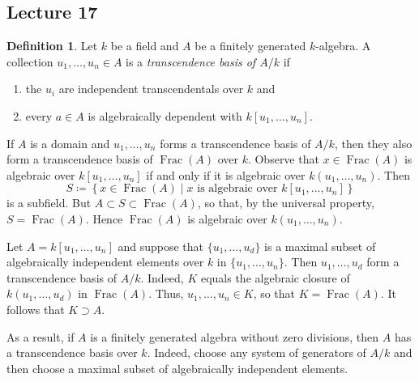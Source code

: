 \documentclass[10pt,letterpaper,cm]{nupset}
\theoremstyle{definition}
\newtheorem{definition}{Definition}[subsection]
\theoremstyle{theorem}
\theoremstyle{remark}
\newcommand{\1}{\mathbf{1}}
\newcommand{\0}{\vec 0}
\DeclareMathOperator{\Frac}{Frac}
\begin{document}
\subsection{Lecture 17}

\begin{definition}
Let $k$ be a field and $A$ be a finitely generated $k$-algebra. A collection $u_1, \ldots, u_n \in A$ is a \textit{transcendence basis of $A/k$} if 
\begin{enumerate}[label=(\roman*)]
\item the $u_i$ are independent transcendentals over $k$ and
\item every $a\in A$ is algebraically dependent with $k[u_1, \ldots, u_n]$. 
\end{enumerate}
\end{definition}


If $A$ is a domain and $u_1, \ldots, u_n$ forms a transcendence basis of $A/k$, then they also form a transcendence basis of $\Frac(A)$ over $k$. Observe that $x\in \Frac(A)$ is algebraic over $k[u_1, \ldots, u_n]$ if and only if it is algebraic over $k(u_1, \ldots, u_n)$. Then $$S\coloneqq  \left\{x\in \Frac(A) \mid x \text{ is algebraic over }k[u_1, \ldots, u_n]\right\}$$ is a subfield. But $A \subset S \subset \Frac(A)$, so that, by the universal property, $S= \Frac(A)$. Hence $\Frac(A)$ is algebraic over $k(u_1, \ldots, u_n)$. 

Let $A = k[u_1, \ldots, u_n]$ and suppose that $\{u_1, \ldots, u_d\}$ is a maximal subset of algebraically independent elements over $k$ in $\{u_1, \ldots, u_n\}$. Then $u_1, \ldots, u_d$ form a transcendence basis of $A/k$. Indeed, $K$ equals the algebraic closure of $k(u_1, \ldots, u_d)$ in $\Frac(A)$. Thus, $u_1, \ldots, u_n \in K$, so that $K = \Frac(A)$. It follows that $K \supset A$. 

As a result, if $A$ is a finitely generated algebra without zero divisions, then $A$ has a transcendence basis over $k$. Indeed, choose any system of generators of $A/k$ and then choose a maximal subset of algebraically independent elements. 
\end{document}

